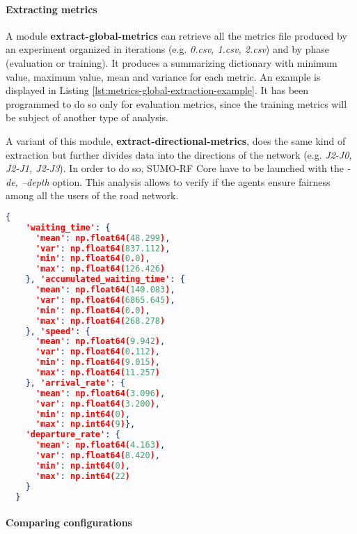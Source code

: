\paragraph{Extracting metrics}

A module \textbf{extract-global-metrics} can retrieve all the metrics file produced by an experiment organized in iterations (e.g. \textit{0.csv, 1.csv, 2.csv}) and by phase (evaluation or training).
It produces a summarizing dictionary with minimum value, maximum value, mean and variance for each metric.
An example is displayed in Listing \ref{lst:metrics-global-extraction-example}.
It has been programmed to do so only for evaluation metrics, since the training metrics will be subject of another type of analysis.

A variant of this module, \textbf{extract-directional-metrics}, does the same kind of extraction but further divides data into the directions of the network (e.g. \textit{J2-J0, J2-J1, J2-J3}).
In order to do so, SUMO-RF Core have to be launched with the \textit{-de, --depth} option.
This analysis allows to verify if the agents ensure fairness among all the users of the road network.

\noindent
\begin{minipage}{\linewidth}
\begin{lstlisting}[language=JSON, caption=Example of dictionary of metrics extracted from the metric files, label={lst:metrics-global-extraction-example}]
  {
    'waiting_time': {
      'mean': np.float64(48.299),
      'var': np.float64(837.112),
      'min': np.float64(0.0),
      'max': np.float64(126.426)
    }, 'accumulated_waiting_time': {
      'mean': np.float64(140.083),
      'var': np.float64(6865.645),
      'min': np.float64(0.0),
      'max': np.float64(268.278)
    }, 'speed': {
      'mean': np.float64(9.942),
      'var': np.float64(0.112),
      'min': np.float64(9.015),
      'max': np.float64(11.257)
    }, 'arrival_rate': {
      'mean': np.float64(3.096),
      'var': np.float64(3.200),
      'min': np.int64(0),
      'max': np.int64(9)},
    'departure_rate': {
      'mean': np.float64(4.163),
      'var': np.float64(8.420),
      'min': np.int64(0),
      'max': np.int64(22)
    }
  }
\end{lstlisting}
\end{minipage}

\paragraph{Comparing configurations}

